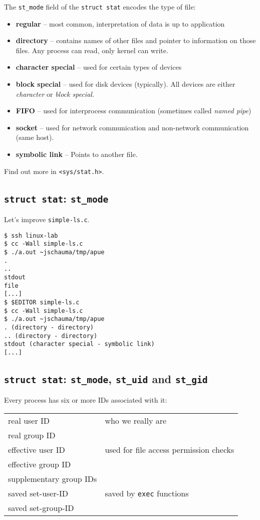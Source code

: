 \documentclass[xga]{xdvislides}
\begin{document}
The {\tt st\_mode} field of the {\tt struct stat} encodes the type of file:

\begin{itemize}
	\item {\bf regular} -- most common, interpretation of data is up to
		application
	\item {\bf directory} -- contains names of other files and pointer to
		information on those files. Any process can read, only kernel
		can write.
	\item {\bf character special} -- used for certain types of devices
	\item {\bf block special} -- used for disk devices (typically). All
		devices are either {\em character} or {\em block special}.
	\item {\bf FIFO} -- used for interprocess communication
		(sometimes called {\em named pipe})
	\item {\bf socket} -- used for network communication and non-network
		communication (same host).
	\item {\bf symbolic link} -- Points to another file.
\end{itemize}
\vspace{.25in}
Find out more in {\tt <sys/stat.h>}.

\subsection{{\tt struct stat}: {\tt st\_mode}}
Let's improve {\tt simple-ls.c}.

\begin{verbatim}
$ ssh linux-lab
$ cc -Wall simple-ls.c
$ ./a.out ~jschauma/tmp/apue
.
..
stdout
file
[...]
$ $EDITOR simple-ls.c
$ cc -Wall simple-ls.c
$ ./a.out ~jschauma/tmp/apue
. (directory - directory)
.. (directory - directory)
stdout (character special - symbolic link)
[...]
\end{verbatim}


%

\subsection{{\tt struct stat}: {\tt st\_mode}, {\tt st\_uid} and {\tt st\_gid}}
Every process has six or more IDs associated with it:
\\

\begin{tabular}{| l | l |}
	\hline
	real user ID & who we really are \\
	real group ID & \\
	\hline
	effective user ID & used for file access permission checks \\
	effective group ID & \\
	supplementary group IDs & \\
	\hline
	saved set-user-ID & saved by {\tt exec} functions \\
	saved set-group-ID & \\
	\hline
\end{tabular}
\vspace{.25in}
\end{document}
